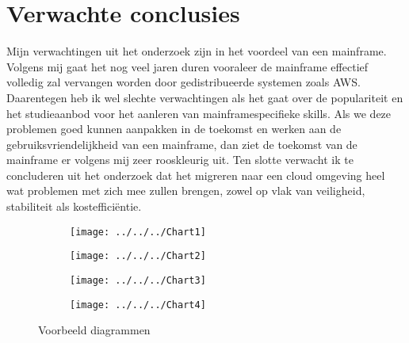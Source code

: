 \section{Verwachte conclusies}
\label{sec:verwachte_conclusies}
Mijn verwachtingen uit het onderzoek zijn in het voordeel van een mainframe. Volgens mij gaat het nog veel jaren duren vooraleer de mainframe effectief volledig zal vervangen worden door gedistribueerde systemen zoals AWS. Daarentegen heb ik wel slechte verwachtingen als het gaat over de populariteit en het studieaanbod voor het aanleren van mainframespecifieke skills. Als we deze problemen goed kunnen aanpakken in de toekomst en werken aan de gebruiksvriendelijkheid van een mainframe, dan ziet de toekomst van de mainframe er volgens mij zeer rooskleurig uit. Ten slotte verwacht ik te concluderen uit het onderzoek dat het migreren naar een cloud omgeving heel wat problemen met zich mee zullen brengen, zowel op vlak van veiligheid, stabiliteit als kostefficiëntie. 
\begin{figure}
    \centering
    \begin{subfigure}{0.3\textwidth}
    \centering
    \texttt{[image: ../../../Chart1]}
    \caption{}
    \label{fig:chart1}
    \end{subfigure}
    \hfill
    \begin{subfigure}{0.3\textwidth}
        \centering
        \texttt{[image: ../../../Chart2]}
        \caption{}
        \label{fig:chart2}
    \end{subfigure}
    \hfill
    \begin{subfigure}{0.3\textwidth}
        \centering
        \texttt{[image: ../../../Chart3]}
        \caption{}
        \label{fig:chart3}
    \end{subfigure}
    \hfill
    \begin{subfigure}{0.3\textwidth}
        \centering
        \texttt{[image: ../../../Chart4]}
        \caption{}
        \label{fig:chart4}
    \end{subfigure}
\caption{Voorbeeld diagrammen}
\end{figure}




